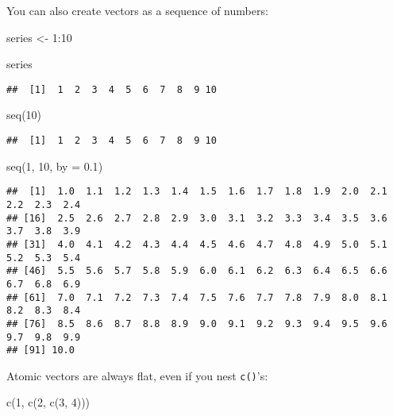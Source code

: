 \documentclass[
]{book}
\newenvironment{Shaded}{\begin{snugshade}}{\end{snugshade}}
\newcommand{\AttributeTok}[1]{\textcolor[rgb]{0.77,0.63,0.00}{#1}}
\newcommand{\DecValTok}[1]{\textcolor[rgb]{0.00,0.00,0.81}{#1}}
\newcommand{\FloatTok}[1]{\textcolor[rgb]{0.00,0.00,0.81}{#1}}
\newcommand{\FunctionTok}[1]{\textcolor[rgb]{0.00,0.00,0.00}{#1}}
\newcommand{\NormalTok}[1]{#1}
\newcommand{\OtherTok}[1]{\textcolor[rgb]{0.56,0.35,0.01}{#1}}
\newcommand{\SpecialCharTok}[1]{\textcolor[rgb]{0.00,0.00,0.00}{#1}}
\begin{document}
You can also create vectors as a sequence of numbers:

\begin{Shaded}
\begin{Highlighting}[]
\NormalTok{series }\OtherTok{\textless{}{-}} \DecValTok{1}\SpecialCharTok{:}\DecValTok{10}

\NormalTok{series}
\end{Highlighting}
\end{Shaded}

\begin{verbatim}
##  [1]  1  2  3  4  5  6  7  8  9 10
\end{verbatim}

\begin{Shaded}
\begin{Highlighting}[]
\FunctionTok{seq}\NormalTok{(}\DecValTok{10}\NormalTok{)}
\end{Highlighting}
\end{Shaded}

\begin{verbatim}
##  [1]  1  2  3  4  5  6  7  8  9 10
\end{verbatim}

\begin{Shaded}
\begin{Highlighting}[]
\FunctionTok{seq}\NormalTok{(}\DecValTok{1}\NormalTok{, }\DecValTok{10}\NormalTok{, }\AttributeTok{by =} \FloatTok{0.1}\NormalTok{)}
\end{Highlighting}
\end{Shaded}

\begin{verbatim}
##  [1]  1.0  1.1  1.2  1.3  1.4  1.5  1.6  1.7  1.8  1.9  2.0  2.1  2.2  2.3  2.4
## [16]  2.5  2.6  2.7  2.8  2.9  3.0  3.1  3.2  3.3  3.4  3.5  3.6  3.7  3.8  3.9
## [31]  4.0  4.1  4.2  4.3  4.4  4.5  4.6  4.7  4.8  4.9  5.0  5.1  5.2  5.3  5.4
## [46]  5.5  5.6  5.7  5.8  5.9  6.0  6.1  6.2  6.3  6.4  6.5  6.6  6.7  6.8  6.9
## [61]  7.0  7.1  7.2  7.3  7.4  7.5  7.6  7.7  7.8  7.9  8.0  8.1  8.2  8.3  8.4
## [76]  8.5  8.6  8.7  8.8  8.9  9.0  9.1  9.2  9.3  9.4  9.5  9.6  9.7  9.8  9.9
## [91] 10.0
\end{verbatim}

Atomic vectors are always flat, even if you nest \texttt{c()}'s:

\begin{Shaded}
\begin{Highlighting}[]
\FunctionTok{c}\NormalTok{(}\DecValTok{1}\NormalTok{, }\FunctionTok{c}\NormalTok{(}\DecValTok{2}\NormalTok{, }\FunctionTok{c}\NormalTok{(}\DecValTok{3}\NormalTok{, }\DecValTok{4}\NormalTok{)))}
\end{Highlighting}
\end{Shaded}
\end{document}
